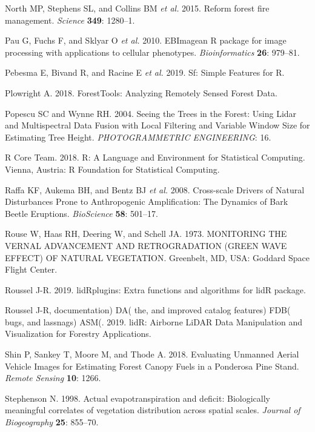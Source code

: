 \documentclass[]{article}
\begin{document}
\hypertarget{ref-north2015}{}
North MP, Stephens SL, and Collins BM \emph{et al.} 2015. Reform forest
fire management. \emph{Science} \textbf{349}: 1280--1.

\hypertarget{ref-pau2010}{}
Pau G, Fuchs F, and Sklyar O \emph{et al.} 2010. EBImagean R package for
image processing with applications to cellular phenotypes.
\emph{Bioinformatics} \textbf{26}: 979--81.

\hypertarget{ref-pebesma2019}{}
Pebesma E, Bivand R, and Racine E \emph{et al.} 2019. Sf: Simple
Features for R.

\hypertarget{ref-plowright2018}{}
Plowright A. 2018. ForestTools: Analyzing Remotely Sensed Forest Data.

\hypertarget{ref-popescu2004}{}
Popescu SC and Wynne RH. 2004. Seeing the Trees in the Forest: Using
Lidar and Multispectral Data Fusion with Local Filtering and Variable
Window Size for Estimating Tree Height. \emph{PHOTOGRAMMETRIC
ENGINEERING}: 16.

\hypertarget{ref-rcoreteam2018}{}
R Core Team. 2018. R: A Language and Environment for Statistical
Computing. Vienna, Austria: R Foundation for Statistical Computing.

\hypertarget{ref-raffa2008}{}
Raffa KF, Aukema BH, and Bentz BJ \emph{et al.} 2008. Cross-scale
Drivers of Natural Disturbances Prone to Anthropogenic Amplification:
The Dynamics of Bark Beetle Eruptions. \emph{BioScience} \textbf{58}:
501--17.

\hypertarget{ref-rouse1973}{}
Rouse W, Haas RH, Deering W, and Schell JA. 1973. MONITORING THE VERNAL
ADVANCEMENT AND RETROGRADATION (GREEN WAVE EFFECT) OF NATURAL
VEGETATION. Greenbelt, MD, USA: Goddard Space Flight Center.

\hypertarget{ref-roussel2019a}{}
Roussel J-R. 2019. lidRplugins: Extra functions and algorithms for lidR
package.

\hypertarget{ref-roussel2019}{}
Roussel J-R, documentation) DA( the, and improved catalog features) FDB(
bugs, and lassnags) ASM(. 2019. lidR: Airborne LiDAR Data Manipulation
and Visualization for Forestry Applications.

\hypertarget{ref-shin2018}{}
Shin P, Sankey T, Moore M, and Thode A. 2018. Evaluating Unmanned Aerial
Vehicle Images for Estimating Forest Canopy Fuels in a Ponderosa Pine
Stand. \emph{Remote Sensing} \textbf{10}: 1266.

\hypertarget{ref-stephenson1998}{}
Stephenson N. 1998. Actual evapotranspiration and deficit: Biologically
meaningful correlates of vegetation distribution across spatial scales.
\emph{Journal of Biogeography} \textbf{25}: 855--70.
\end{document}
